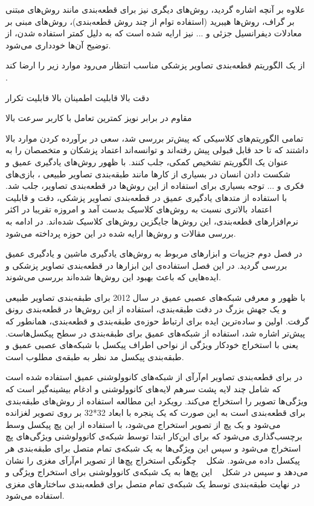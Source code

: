 علاوه بر آنچه اشاره گردید، روش‌های دیگری نیز برای قطعه‌بندی مانند روش‌های مبتنی بر گراف، روش‌ها هیبرید (استفاده توام از چند روش قطعه‌بندی)، روش‌های مبنی بر معادلات دیفرانسیل جزئی و ... نیز ارایه شده است  که به دلیل کمتر استفاده شدن، از توضیح آن‌ها خودداری می‌شود.

از یک الگوریتم قطعه‌بندی تصاویر پزشکی مناسب انتظار می‌رود موارد زیر را ارضا کند .
\begin{multicols}{2}
	 دقت بالا
	 قابلیت اطمینان بالا
	 قابلیت تکرار
	
	 مقاوم در برابر نویز
	 کمترین تعامل با کاربر
	 سرعت بالا
	
\end{multicols}
تمامی الگوریتم‌های کلاسیکی که پیش‌تر بررسی شد، سعی در برآورده کردن موارد بالا داشتند که تا حد قابل قبولی پیش رفته‌اند و توانسه‌اند اعتماد پزشکان و متخصصان را به عنوان یک الگوریتم تشخیص کمکی، جلب کنند. با ظهور روش‌های یادگیری عمیق و شکست دادن انسان  در بسیاری از کارها مانند طبقه‌بندی تصاویر طبیعی ، بازی‌های فکری و ... توجه بسیاری برای استفاده از این روش‌ها در قطعه‌بندی تصاویر، جلب شد. با استفاده‌ از متدهای یادگیری عمیق در قطعه‌بندی تصاویر پزشکی، دقت و قابلیت اعتماد بالاتری نسبت به روش‌های کلاسیک بدست آمد و امروزه تقریبا در اکثر نرم‌افزارهای قطعه‌بندی، این روش‌ها جایگزین روش‌های کلاسیک شده‌اند. در ادامه به بررسی مقالات و روش‌ها ارایه شده در این حوزه پرداخته می‌شود.

در فصل دوم جزییات و ابزارهای مربوط به روش‌های یادگیری ماشین و یادگیری عمیق بررسی گردید. در این فصل استفاده‌ی این ابزارها در قطعه‌بندی تصاویر پزشکی و ایده‌هایی که باعث بهبود این روش‌ها شده‌اند بررسی می‌شوند.

با ظهور و معرفی شبکه‌های عصبی عمیق در سال 2012 برای طبقه‌بندی تصاویر طبیعی  و یک جهش بزرگ در دقت طبقه‌بندی، استفاده از این روش‌ها در قطعه‌بندی رونق گرفت. اولین و ساده‌ترین ایده‌ برای ارتباط حوزه‌ی طبقه‌بندی و قطعه‌بندی، همانطور که پیش‌تر اشاره شد، استفاده از شبکه‌های عمیق برای طبقه‌بندی در سطح پیکسل‌هاست. یعنی با استخراج خودکار ویژگی از نواحی اطراف پیکسل با شبکه‌های عصبی عمیق و طبقه‌بندی پیکسل مد نظر به طبقه‌ی مطلوب است.

در  برای قطعه‌بندی تصاویر ام‌آرآی از شبکه‌های کانوولوشنی عمیق استفاده شده است که شامل چند لایه‌ پشت سرهم لایه‌های کانوولوشنی و ادغام بیشینه‌گیر است که ویژگی‌ها تصویر را استخراج می‌‌کند. رویکرد این مطالعه استفاده از روش‌های طبقه‌بندی برای قطعه‌بندی است به این صورت که یک پنجره با ابعاد 32*32 بر روی تصویر لغزانده می‌شود و یک پچ از تصویر استخراج می‌شود، با استفاده از این پچ پیکسل وسط برچسب‌گذاری می‌شود که برای این‌کار ابتدا توسط شبکه‌ی کانوولوشنی ویژگی‌های پچ استخراج می‌شود و سپس این ویژگی‌ها به یک شبکه‌ی تمام متصل برای طبقه‌بندی هر پیکسل داده می‌شود. شکل ~ چگونگی استخراج پچ‌ها از تصویر ام‌آرآی مغزی را نشان می‌دهد و سپس در شکل ~ این پچ‌ها به یک شبکه‌ی کانوولوشنی برای استخراج ویژگی و در نهایت طبقه‌بندی توسط یک شبکه‌ی تمام متصل برای قطعه‌بندی ساختارهای مغزی استفاده می‌شود.

